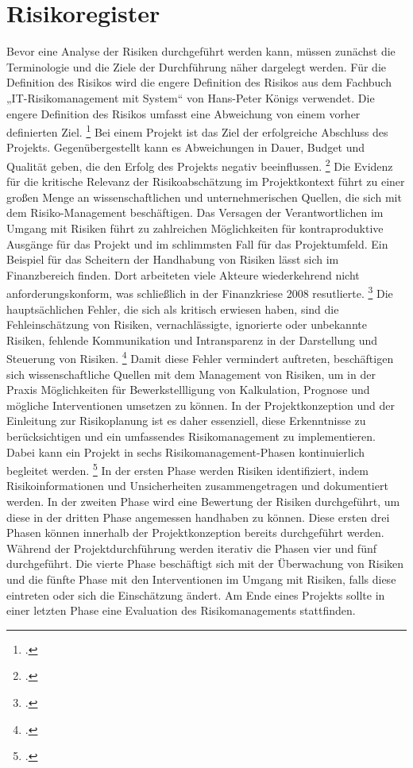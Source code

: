 \chapter{Risikoregister}
Bevor eine Analyse der Risiken durchgeführt werden kann, müssen zunächst die Terminologie und die Ziele der Durchführung näher dargelegt werden. 
Für die Definition des Risikos wird die engere Definition des Risikos aus dem Fachbuch „IT-Risikomanagement mit System“ von Hans-Peter Königs verwendet. 
Die engere Definition des Risikos umfasst eine Abweichung von einem vorher definierten Ziel.
\footcite[Vgl.][12]{koenigsITRisikomanagementMitSystem2017}
Bei einem Projekt ist das Ziel der erfolgreiche Abschluss des Projekts.
Gegenübergestellt kann es Abweichungen in Dauer, Budget und Qualität geben, die den Erfolg des Projekts negativ beeinflussen.
\footcite[Vgl.][13]{koenigsITRisikomanagementMitSystem2017}
Die Evidenz für die kritische Relevanz der Risikoabschätzung im Projektkontext führt zu einer großen
Menge an wissenschaftlichen und unternehmerischen Quellen, die sich mit dem Risiko-Management beschäftigen.
Das Versagen der Verantwortlichen im Umgang mit Risiken führt zu zahlreichen Möglichkeiten für kontraproduktive Ausgänge für das Projekt und im schlimmsten Fall für das Projektumfeld.
Ein Beispiel für das Scheitern der Handhabung von Risiken lässt sich im Finanzbereich finden.
Dort arbeiteten viele Akteure wiederkehrend nicht anforderungskonform, was schließlich in der Finanzkriese 2008 resutlierte.
\footcite[Vgl.][39]{stulzRiskManagementFailures2008}
Die hauptsächlichen Fehler, die sich als kritisch erwiesen haben, sind die Fehleinschätzung von Risiken,
vernachlässigte, ignorierte oder unbekannte Risiken, fehlende Kommunikation und Intransparenz in der Darstellung und Steuerung von Risiken.
\footcite[Vgl.][S. 42 ff.]{stulzRiskManagementFailures2008}
Damit diese Fehler vermindert auftreten, beschäftigen sich wissenschaftliche Quellen mit dem Management von Risiken,
um in der Praxis Möglichkeiten für Bewerkstellligung von Kalkulation, Prognose und mögliche Interventionen umsetzen zu können.
In der Projektkonzeption und der Einleitung zur Risikoplanung ist es daher essenziell, diese Erkenntnisse zu berücksichtigen
und ein umfassendes Risikomanagement zu implementieren. Dabei kann ein Projekt in sechs Risikomanagement-Phasen kontinuierlich begleitet werden.
\footcite[Vgl.][45]{dikmenLearningRisksTool2008}
In der ersten Phase werden Risiken identifiziert, indem Risikoinformationen und Unsicherheiten zusammengetragen und dokumentiert werden.
In der zweiten Phase wird eine Bewertung der Risiken durchgeführt, um diese in der dritten Phase angemessen handhaben zu können.
Diese ersten drei Phasen können innerhalb der Projektkonzeption bereits durchgeführt werden.
Während der Projektdurchführung werden iterativ die Phasen vier und fünf durchgeführt. Die vierte
Phase beschäftigt sich mit der Überwachung von Risiken und die fünfte Phase mit den Interventionen im
Umgang mit Risiken, falls diese eintreten oder sich die Einschätzung ändert. Am Ende eines Projekts
sollte in einer letzten Phase eine Evaluation des Risikomanagements stattfinden.

